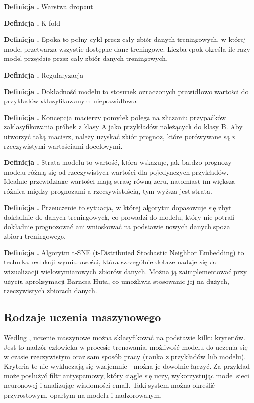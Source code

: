 \noindent
\textbf{Definicja \mlDefinitionIndex.}
\incrementMlDefinitionIndex
Warstwa dropout

\noindent
\textbf{Definicja \mlDefinitionIndex.}
\incrementMlDefinitionIndex
K-fold

\noindent
\textbf{Definicja \mlDefinitionIndex.}
\incrementMlDefinitionIndex
Epoka to pełny cykl przez cały zbiór danych treningowych, w której model przetwarza wszystie dostępne dane treningowe.
Liczba epok określa ile razy model przejdzie przez cały zbiór danych treningowych.

\noindent
\textbf{Definicja \mlDefinitionIndex.}
\incrementMlDefinitionIndex
Regularyzacja

\noindent
\textbf{Definicja \mlDefinitionIndex.}
\incrementMlDefinitionIndex
Dokładność modelu to stosunek oznaczonych prawidłowo wartości do przykładów sklasyfikowanych nieprawidłowo.

\noindent
\textbf{Definicja \mlDefinitionIndex.}
\incrementMlDefinitionIndex
Koncepcja macierzy pomyłek polega na zliczaniu przypadków zaklasyfikowania próbek z klasy A jako przykładów należących do klasy B.
Aby utworzyć taką macierz, należy uzyskać zbiór prognoz, które porówywane są z rzeczywistymi wartościami docelowymi.

\noindent
\textbf{Definicja \mlDefinitionIndex.}
\incrementMlDefinitionIndex
Strata modelu to wartość, która wskazuje,
jak bardzo prognozy modelu różnią się od rzeczywistych wartości dla pojedynczych przykładów.
Idealnie przewidziane wartości mają stratę równą zeru,
natomiast im większa różnica między prognozami a rzeczywistością, tym wyższa jest strata.

\noindent
\textbf{Definicja \mlDefinitionIndex.}
\incrementMlDefinitionIndex
Przeuczenie to sytuacja, w której algorytm dopasowuje się zbyt dokładnie do danych treningowych,
co prowadzi do modelu, który nie potrafi dokładnie prognozować ani wnioskować na podstawie nowych danych spoza zbioru treningowego. 

\noindent
\textbf{Definicja \mlDefinitionIndex.}
\incrementMlDefinitionIndex
Algorytm t-SNE (t-Distributed Stochastic Neighbor Embedding) to technika redukcji wymiarowości,
która szczególnie dobrze nadaje się do wizualizacji wielowymiarowych zbiorów danych.
Można ją zaimplementować przy użyciu aproksymacji Barnesa-Huta,
co umożliwia stosowanie jej na dużych, rzeczywistych zbiorach danych.

\subsection{Rodzaje uczenia maszynowego}
Według \cite{Geron2020}, uczenie maszynowe można sklasyfikować na podstawie kilku kryteriów.
Jest to nadzór człowieka w procesie trenowania, możliwość modelu do uczenia się w czasie rzeczywistym
oraz sam sposób pracy (nauka z przykładów lub modelu). Kryteria te nie wykluczają się wzajemnie - można je dowolnie łączyć.
Za przykład może posłużyć filtr antyspamowy, który ciągle się uczy,
wykorzystując model sieci neuronowej i analizując wiadomości email.
Taki system można określić przyrostowym, opartym na modelu i nadzorowanym.

